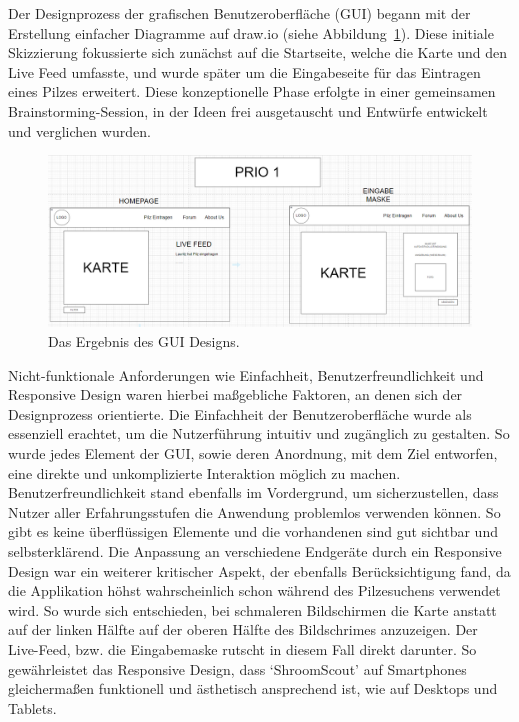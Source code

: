 \documentclass[../main.tex]{subfiles} %
\begin{document}
Der Designprozess der grafischen Benutzeroberfläche (GUI) begann mit der Erstellung einfacher Diagramme auf draw.io
(siehe Abbildung~\ref{fig:GUI_Entwurf}). Diese initiale Skizzierung fokussierte sich zunächst auf die Startseite, welche
die Karte und den Live Feed umfasste, und wurde später um die Eingabeseite für das Eintragen eines Pilzes erweitert. Diese
konzeptionelle Phase erfolgte in einer gemeinsamen Brainstorming-Session, in der Ideen frei ausgetauscht und Entwürfe
entwickelt und verglichen wurden.

\begin{figure}[htbp]
	\centering
	\includegraphics[width=\textwidth]{../abbildungen/GUI_Entwurf_Drawio.jpg}
	\caption{Das Ergebnis des GUI Designs.}\label{fig:GUI_Entwurf}
\end{figure}

Nicht-funktionale Anforderungen wie Einfachheit, Benutzerfreundlichkeit und Responsive Design waren hierbei maßgebliche
Faktoren, an denen sich der Designprozess orientierte. Die Einfachheit der Benutzeroberfläche wurde als essenziell erachtet,
um die Nutzerführung intuitiv und zugänglich zu gestalten. So wurde jedes Element der GUI, sowie deren Anordnung, mit dem Ziel
entworfen, eine direkte und unkomplizierte Interaktion möglich zu machen. Benutzerfreundlichkeit stand ebenfalls im Vordergrund,
um sicherzustellen, dass Nutzer aller Erfahrungsstufen die Anwendung problemlos verwenden können. So gibt es keine überflüssigen
Elemente und die vorhandenen sind gut sichtbar und selbsterklärend. Die Anpassung an verschiedene Endgeräte durch ein Responsive
Design war ein weiterer kritischer Aspekt, der ebenfalls Berücksichtigung fand, da die Applikation höhst wahrscheinlich schon
während des Pilzesuchens verwendet wird. So wurde sich entschieden, bei schmaleren Bildschirmen die Karte anstatt auf der linken
Hälfte auf der oberen Hälfte des Bildschrimes anzuzeigen. Der Live-Feed, bzw. die Eingabemaske rutscht in diesem Fall direkt darunter.
So gewährleistet das Responsive Design, dass `ShroomScout' auf Smartphones gleichermaßen funktionell und ästhetisch ansprechend ist,
wie auf Desktops und Tablets.
\end{document}
